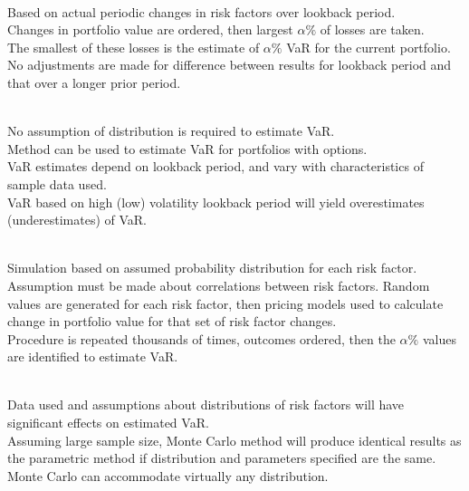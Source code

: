 \begin{method} \\
Based on actual periodic changes in risk factors over lookback period.\\
Changes in portfolio value are ordered, then largest $\alpha \%$ of losses are taken.\\
The smallest of these losses is the estimate of $\alpha \%$ VaR for the current portfolio.\\
No adjustments are made for difference between results for lookback period and that over a longer prior period.
\end{method}

\begin{remark} \\
No assumption of distribution is required to estimate VaR.\\
Method can be used to estimate VaR for portfolios with options.\\
VaR estimates depend on lookback period, and vary with characteristics of sample data used.\\
VaR based on high (low) volatility lookback period will yield overestimates (underestimates) of VaR.
\end{remark}

\begin{method} \\
Simulation based on assumed probability distribution for each risk factor.\\
Assumption must be made about correlations between risk factors. Random values are generated for each risk factor, then pricing models used to calculate change in portfolio value for that set of risk factor changes.\\
Procedure is repeated thousands of times, outcomes ordered, then the $\alpha \%$ values are identified to estimate VaR.
\end{method}

\begin{remark} \\
Data used and assumptions about distributions of risk factors will have significant effects on estimated VaR.\\
Assuming large sample size, Monte Carlo method will produce identical results as the parametric method if distribution and parameters specified are the same.\\
Monte Carlo can accommodate virtually any distribution.
\end{remark}

